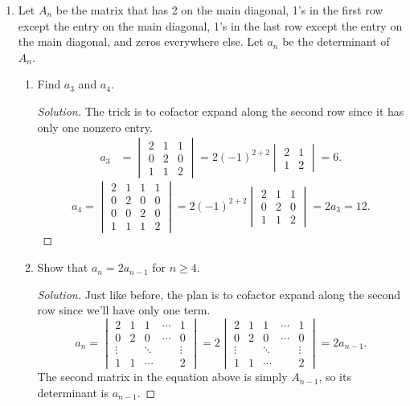 \documentclass[11pt,letterpaper]{report}
\newenvironment{solution}
{\begin{proof}[Solution]}
{\end{proof}}
\begin{document}
\begin{enumerate}
	\item Let $A_n$ be the matrix that has 2 on the main diagonal, 1's in the first row except the entry on the main diagonal, 1's in the last row except the entry on the main diagonal, and zeros everywhere else. Let $a_n$ be the determinant of $A_n$.
	\begin{enumerate}
		\item Find $a_3$ and $a_4$.
		\begin{solution}
			The trick is to cofactor expand along the second row since it has only one nonzero entry.
			\begin{align}
				a_3 &= \begin{vmatrix}
					2&1&1\\
					0&2&0\\
					1&1&2
				\end{vmatrix} = 2(-1)^{2+2} \begin{vmatrix}
					2&1\\
					1&2
				\end{vmatrix} = 6.
			\end{align}
			\[
			a_4 = \begin{vmatrix}
				2&1&1&1\\
				0&2&0&0\\
				0&0&2&0\\
				1&1&1&2
			\end{vmatrix} = 2(-1)^{2+2} \begin{vmatrix}
				2 & 1 & 1\\
				0&2&0\\
				1&1&2
			\end{vmatrix} = 2a_3 = 12.
			\]
		\end{solution}
		\item Show that $a_n = 2a_{n-1}$ for $n\geq 4$.
		\begin{solution}
			Just like before, the plan is to cofactor expand along the second row since we'll have only one term.
			\[
			a_n = \begin{vmatrix}
				2&1&1&\cdots&1\\
				0&2&0&\cdots&0\\
				\vdots&&\ddots&&\vdots\\
				1&1&\cdots&&2
			\end{vmatrix} = 2 \begin{vmatrix}
				2&1&1&\cdots&1\\
				0&2&0&\cdots&0\\
				\vdots&&\ddots&&\vdots\\
				1&1&\cdots&&2
			\end{vmatrix} = 2a_{n-1}.
			\]
			The second matrix in the equation above is simply $A_{n-1}$, so its determinant is $a_{n-1}$.
		\end{solution}
	\end{enumerate}


\end{enumerate}
\end{document}

